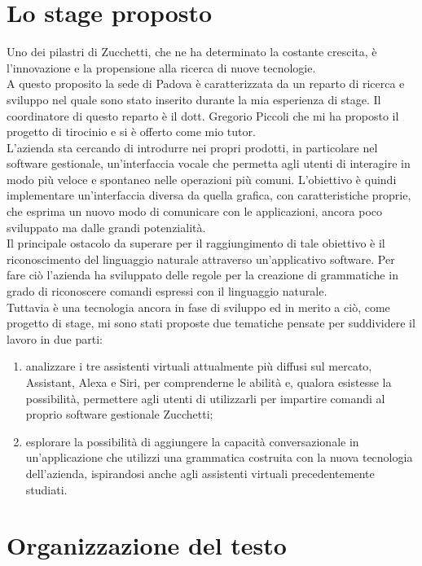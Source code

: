 \section{Lo stage proposto}
Uno dei pilastri di Zucchetti, che ne ha determinato la costante crescita, è l'innovazione e la propensione alla ricerca di nuove tecnologie. \\
A questo proposito la sede di Padova è caratterizzata da un reparto di ricerca e sviluppo nel quale sono stato inserito durante la mia esperienza di stage. Il coordinatore di questo reparto è il dott. Gregorio Piccoli che mi ha proposto il progetto di tirocinio e si è offerto come mio tutor. \\
L'azienda sta cercando di introdurre nei propri prodotti, in particolare nel software gestionale, un'interfaccia vocale che permetta agli utenti di interagire in modo più veloce e spontaneo nelle operazioni più comuni. L'obiettivo è quindi implementare un'interfaccia diversa da quella grafica, con caratteristiche proprie, che esprima un nuovo modo di comunicare con le applicazioni, ancora poco sviluppato ma dalle grandi potenzialità. \\
Il principale ostacolo da superare per il raggiungimento di tale obiettivo è il riconoscimento del linguaggio naturale attraverso un'applicativo software. Per fare ciò l'azienda ha sviluppato delle regole per la creazione di grammatiche in grado di riconoscere comandi espressi con il linguaggio naturale. \\
Tuttavia è una tecnologia ancora in fase di sviluppo ed in merito a ciò, come progetto di stage, mi sono stati proposte due tematiche pensate per suddividere il lavoro in due parti:
\begin{enumerate}
	\item analizzare i tre assistenti virtuali attualmente più diffusi sul mercato, Assistant, Alexa e Siri, per comprenderne le abilità e, qualora esistesse la possibilità, permettere agli utenti di utilizzarli per impartire comandi al proprio software gestionale Zucchetti;
	\item esplorare la possibilità di aggiungere la capacità conversazionale in un'applicazione che utilizzi una grammatica costruita con la nuova tecnologia dell'azienda, ispirandosi anche agli assistenti virtuali precedentemente studiati.
\end{enumerate}

\section{Organizzazione del testo}

